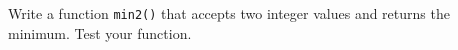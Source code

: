 Write a function \texttt{min2()} that accepts two integer values and returns the minimum. Test your function.

